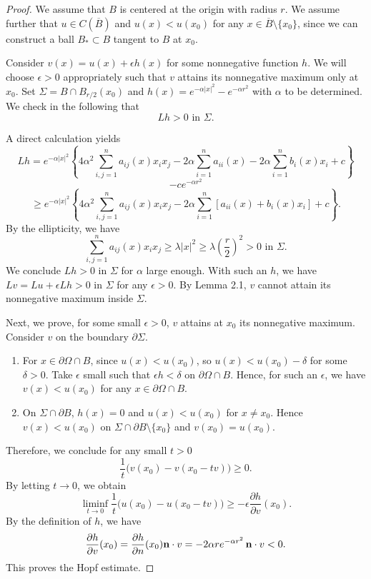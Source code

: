 \begin{proof}
\sketch
We assume that $B$ is centered at the origin with radius $r$. We assume
further that $u \in C(\overline{B})$ and $u(x) < u(x_0)$ for any $x \in \overline{B}\setminus\{x_0\}$, since we can construct
a ball $B_* \subset B$ tangent to $B$ at $x_0$.

Consider $v(x) = u(x) + \epsilon h(x)$ for some nonnegative function $h$. We will choose
$\epsilon > 0$ appropriately such that $v$ attains its nonnegative maximum only at $x_0$. Set
$\Sigma = B \cap B_{r/2}(x_0)$ and $h(x) = e^{-\alpha |x|^2} - e^{-\alpha r^2}$ with $\alpha$ to be determined. We check
in the following that
\[
Lh > 0 \text{ in } \Sigma.
\]

A direct calculation yields
\[
Lh = e^{-\alpha |x|^2}\left\{4\alpha^2\sum_{i,j=1}^n a_{ij}(x)x_i x_j - 2\alpha\sum_{i=1}^n a_{ii}(x) - 2\alpha\sum_{i=1}^n b_i(x)x_i + c\right\}
\]
\[
- ce^{-\alpha r^2}
\]
\[
\ge e^{-\alpha |x|^2}\left\{4\alpha^2\sum_{i,j=1}^n a_{ij}(x)x_i x_j - 2\alpha\sum_{i=1}^n [a_{ii}(x)+b_i(x)x_i] + c\right\}.
\]
By the ellipticity, we have
\[
\sum_{i,j=1}^n a_{ij}(x)x_i x_j \ge \lambda |x|^2 \ge \lambda\left(\frac{r}{2}\right)^2 > 0 \text{ in } \Sigma.
\]
We conclude $Lh > 0$ in $\Sigma$ for $\alpha$ large enough. With such an $h$, we have $Lv = Lu + \epsilon Lh > 0$ in $\Sigma$ for any $\epsilon > 0$. By Lemma 2.1, $v$ cannot attain its nonnegative maximum inside $\Sigma$.

Next, we prove, for some small $\epsilon > 0$, $v$ attains at $x_0$ its nonnegative maximum.
Consider $v$ on the boundary $\partial\Sigma$.
\begin{enumerate}
\item[(i)] For $x \in \partial\Omega \cap B$, since $u(x) < u(x_0)$, so $u(x) < u(x_0)-\delta$ for some $\delta > 0$. Take $\epsilon$ small such that $\epsilon h < \delta$ on $\partial\Omega \cap B$. Hence, for such an $\epsilon$, we have $v(x) < u(x_0)$ for any $x \in \partial\Omega \cap B$.
\item[(ii)] On $\Sigma \cap \partial B$, $h(x)=0$ and $u(x) < u(x_0)$ for $x \neq x_0$. Hence $v(x) < u(x_0)$ on $\Sigma \cap \partial B \setminus \{x_0\}$ and $v(x_0)=u(x_0)$.
\end{enumerate}
Therefore, we conclude for any small $t > 0$
\[
\frac{1}{t}\bigl(v(x_0)-v(x_0-tv)\bigr) \ge 0.
\]
By letting $t \to 0$, we obtain
\[
\liminf_{t\to 0} \frac{1}{t}\bigl(u(x_0)-u(x_0-tv)\bigr) \ge -\epsilon \frac{\partial h}{\partial v}(x_0).
\]
By the definition of $h$, we have
\[
\frac{\partial h}{\partial v}(x_0) = \frac{\partial h}{\partial n}(x_0)\mathbf{n}\cdot v = -2\alpha r e^{-\alpha r^2}\,\mathbf{n}\cdot v < 0.
\]
This proves the Hopf estimate.
\end{proof}

